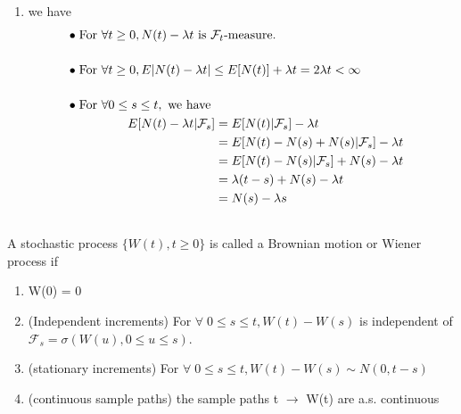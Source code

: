 {\begin{enumerate}
\begin{align*}
\begin{aligned}
                    = \frac{\min\{t, s\}}{\sqrt{s\cdot t}} 
            \end{aligned}
        \end{align*}
    \item we have
        \begin{align*}
            &\begin{aligned}
                \bullet\; \mbox{For } \forall t\ge 0 , N(t) - \lambda t \mbox{ is } \mathcal{F}_t\mbox{-measure}.    
            \end{aligned}\\[1.2em]
            &\begin{aligned}
                \bullet\; \mbox{For }\forall t \ge 0,E|N(t)-\lambda t|\le E[N(t)] + \lambda t  = 2\lambda t < \infty
            \end{aligned}\\[1.2em]
            &\begin{aligned}
                \bullet\; \mbox{For } \forall 0 \le s \le t,\mbox{ we have }\\
                E[N(t)-\lambda t|\mathcal{F}_s] 
                &= E[N(t)|\mathcal{F}_s]  - \lambda t \\
                &= E[N(t)-N(s)+N(s)|\mathcal{F}_s] -\lambda t\\
                &= E[N(t)-N(s)|\mathcal{F}_s] + N(s) - \lambda t\\
                &= \lambda (t-s) + N(s) - \lambda t\\
                &= N(s) - \lambda s
            \end{aligned}\\[1.2em]
        \end{align*}     
\end{enumerate}
}

\begin{Definition}
    A stochastic process $\{W(t),t\ge 0\}$ is called a Brownian motion or Wiener process if 
    \begin{enumerate}
        \item W(0) = 0
        \item (Independent increments) For $\forall\; 0\le s \le t,W(t) - W(s)$ is independent of $\mathcal{F}_s = \sigma (W(u),0\le u \le s)$.
        \item (stationary increments) For $\forall\; 0 \le s \le t,W(t)-W(s)\sim N(0,t-s)$
        \item (continuous sample paths) the sample paths t $\rightarrow$ W(t) are a.s. continuous
    \end{enumerate}
\end{Definition}

